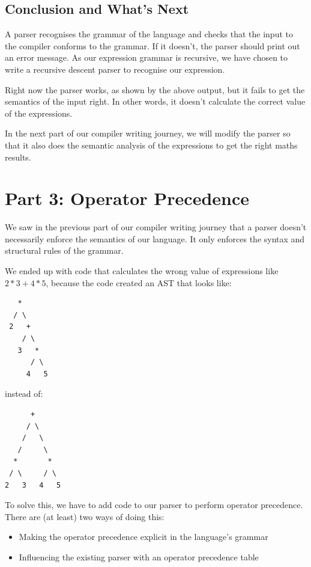 \documentclass[journal, onecolumn, 12pt]{IEEEtran}
\begin{document}
\subsection{Conclusion and What's Next}

A parser recognises the grammar of the language and checks that the input to the compiler conforms to the grammar. If it doesn't, the parser should print out an error message. As our expression grammar is recursive, we have chosen to write a recursive descent parser to recognise our expression.

Right now the parser works, as shown by the above output, but it fails to get the semantics of the input right. In other words, it doesn't calculate the correct value of the expressions.

In the next part of our compiler writing journey, we will modify the parser so that it also does the semantic analysis of the expressions to get the right maths results.

\section{Part 3: Operator Precedence}

We saw in the previous part of our compiler writing journey that a parser doesn't necessarily enforce the semantics of our language. It only enforces the syntax and structural rules of the grammar.

We ended up with code that calculates the wrong value of expressions like $2*3+4*5$, because the code created an AST that looks like:

\begin{lstlisting}
   *
  / \
 2   +
    / \
   3   *
      / \
     4   5
\end{lstlisting}

instead of:

\begin{lstlisting}
      +
     / \
    /   \
   /     \
  *       *
 / \     / \
2   3   4   5
\end{lstlisting}

To solve this, we have to add code to our parser to perform operator precedence. There are (at least) two ways of doing this:

\begin{itemize}
  \item Making the operator precedence explicit in the language's grammar
  \item Influencing the existing parser with an operator precedence table
\end{itemize}
\end{document}
